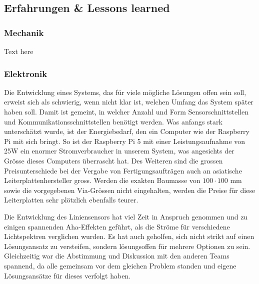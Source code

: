 \documentclass[main.tex]{subfiles} %
\begin{document}
\subsection{Erfahrungen \& Lessons learned}

\subsubsection{Mechanik}
Text here

\subsubsection{Elektronik}
Die Entwicklung eines Systems, das für viele mögliche Lösungen offen sein soll,
erweist sich als schwierig, wenn nicht klar ist, welchen Umfang das System
später haben soll. Damit ist gemeint, in welcher Anzahl und Form
Sensorschnittstellen und Kommunikationsschnittstellen benötigt werden. Was
anfangs stark unterschätzt wurde, ist der Energiebedarf, den ein Computer wie
der Raspberry Pi mit sich bringt. So ist der Raspberry Pi 5 mit einer
Leistungsaufnahme von 25W ein enormer Stromverbraucher in unserem System, was
angesichts der Grösse dieses Computers überrascht hat. Des Weiteren sind die
grossen Preisunterschiede bei der Vergabe von Fertigungsaufträgen auch an
asiatische Leiterplattenhersteller gross. Werden die exakten Baumasse von $100
    \cdot 100$ mm sowie die vorgegebenen Via-Grössen nicht eingehalten, werden die
Preise für diese Leiterplatten sehr plötzlich ebenfalls teurer.

Die Entwicklung des Liniensensors hat viel Zeit in Anspruch genommen und zu
einigen spannenden Aha-Effekten geführt, als die Ströme für verschiedene
Lichtspektren verglichen wurden. Es hat auch geholfen, sich nicht strikt auf
einen Lösungsansatz zu versteifen, sondern lösungsoffen für mehrere Optionen zu
sein. Gleichzeitig war die Abstimmung und Diskussion mit den anderen Teams
spannend, da alle gemeinsam vor dem gleichen Problem standen und eigene
Lösungsansätze für dieses verfolgt haben.
\end{document}
